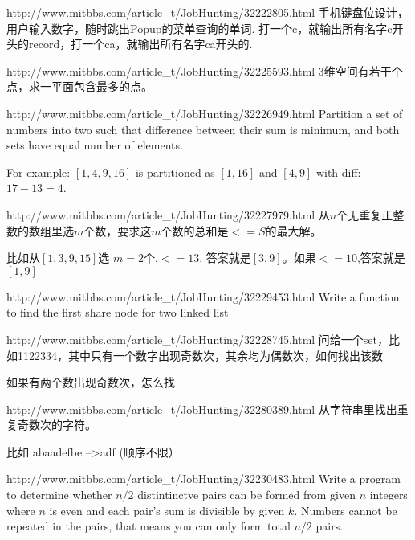 \documentclass[a4paper]{article}
\begin{document}
\begin{CJK}{UTF8}{gbsn}
\begin{enumerate}
\begin{Q}[Amazon]{http://www.mitbbs.com/article_t/JobHunting/32222805.html}
手机键盘位设计，用户输入数字，随时跳出Popup的菜单查询的单词. 打一个c，就输出所有名字c开头的record，打一个ca，就输出所有名字ca开头的.
\end{Q}

\begin{Q}[Amazon]{http://www.mitbbs.com/article_t/JobHunting/32225593.html}
3维空间有若干个点，求一平面包含最多的点。
\end{Q}

\begin{Q}[Google]{http://www.mitbbs.com/article_t/JobHunting/32226949.html}
Partition a set of numbers into two such that difference between their sum is minimum, and both sets have equal number of elements.

For example: $[1, 4, 9, 16]$ is partitioned as $[1,16]$ and $[4,9]$ with diff: $17-13=4$.
\end{Q}

\begin{Q}{http://www.mitbbs.com/article_t/JobHunting/32227979.html}
从$n$个无重复正整数的数组里选$m$个数，要求这$m$个数的总和是$<=S$的最大解。

比如从$[1,3,9,15]$选 $m=2$个,$<=13$, 答案就是$[3,9]$。如果$<=10$,答案就是$[1,9]$
\end{Q}

\begin{Q}[Amazon]{http://www.mitbbs.com/article_t/JobHunting/32229453.html}
Write a function to find the first share node for two linked list
\end{Q}

\begin{Q}[Amazon]{http://www.mitbbs.com/article_t/JobHunting/32228745.html}
问给一个set，比如1122334，其中只有一个数字出现奇数次，其余均为偶数次，如何找出该数

如果有两个数出现奇数次，怎么找
\end{Q}

\begin{Q}[Amazon]{http://www.mitbbs.com/article_t/JobHunting/32280389.html}
从字符串里找出重复奇数次的字符。

比如  abaadefbe  -->adf (顺序不限）
\end{Q}

\begin{Q}[Google]{http://www.mitbbs.com/article_t/JobHunting/32230483.html}
Write a program to determine whether $n/2$ distintinctve pairs can be formed from given $n$ integers where $n$ is even and each pair's sum is divisible by given $k$. Numbers cannot be repeated in the pairs, that means you can only form total $n/2$ pairs.
\end{Q}


\end{enumerate}
\end{CJK}
\end{document}
